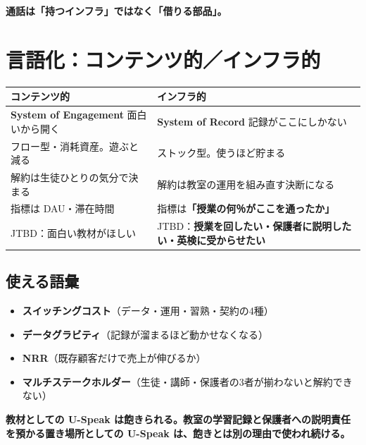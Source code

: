\documentclass[a4paper,10.5pt]{article}
\newcommand{\claim}[1]{%
  \begin{center}\begin{minipage}{0.92\textwidth}
  \color{uspeakGreen}\large\bfseries #1
  \end{minipage}\end{center}}
\begin{document}
\claim{通話は「持つインフラ」ではなく「借りる部品」。}

\section{言語化：コンテンツ的／インフラ的}

\begin{center}
\begin{tabular}{@{}p{}p{}@{}}
\toprule
\textbf{\color{uspeakCoral}コンテンツ的} & \textbf{\color{uspeakGreen}インフラ的} \\
\midrule
\textbf{System of Engagement} \newline 面白いから開く
  & \textbf{System of Record} \newline 記録がここにしかない \\
フロー型・消耗資産。遊ぶと減る
  & ストック型。使うほど貯まる \\
解約は生徒ひとりの気分で決まる
  & 解約は教室の運用を組み直す決断になる \\
指標は DAU・滞在時間
  & 指標は\textbf{「授業の何％がここを通ったか」} \\
JTBD：面白い教材がほしい
  & JTBD：\textbf{授業を回したい・保護者に説明したい・英検に受からせたい} \\
\bottomrule
\end{tabular}
\end{center}

\subsection{使える語彙}

\begin{itemize}[leftmargin=16pt,itemsep=2pt,topsep=2pt]
  \item \textbf{スイッチングコスト}（データ・運用・習熟・契約の4種）
  \item \textbf{データグラビティ}（記録が溜まるほど動かせなくなる）
  \item \textbf{NRR}（既存顧客だけで売上が伸びるか）
  \item \textbf{マルチステークホルダー}（生徒・講師・保護者の3者が揃わないと解約できない）
\end{itemize}

\vspace{2pt}
\claim{教材としての U-Speak は飽きられる。教室の学習記録と保護者への説明責任を預かる置き場所としての U-Speak は、飽きとは別の理由で使われ続ける。}
\end{document}
